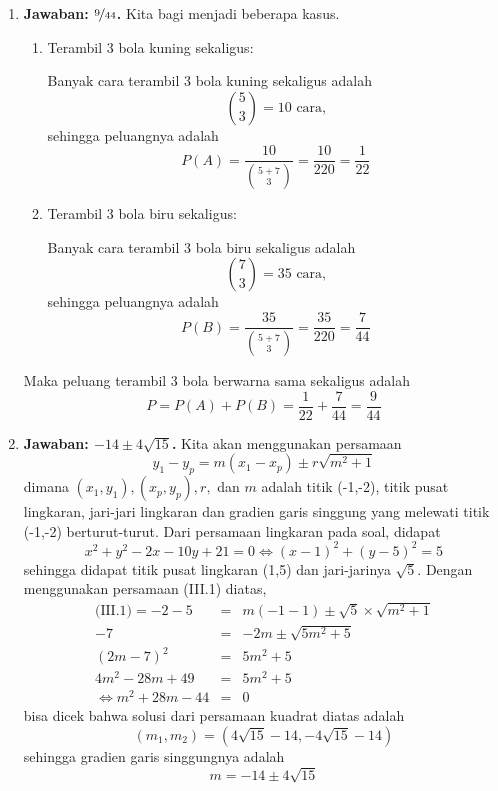 \begin{enumerate}
\item \textbf{Jawaban: $\nicefrac{9}{44}$.} Kita bagi menjadi beberapa kasus.
	\begin{enumerate}
	\item Terambil 3 bola kuning sekaligus:
		\par Banyak cara terambil 3 bola kuning sekaligus adalah $$\binom{5}{3} = 10\text{ cara,}$$sehingga peluangnya adalah $$P(A) = \frac{10}{\binom{5+7}{3}} = \frac{10}{220} = 		\frac{1}{22}$$
	\item Terambil 3 bola biru sekaligus:
		\par Banyak cara terambil 3 bola biru sekaligus adalah $$\binom{7}{3} = 35\text{ cara,}$$sehingga peluangnya adalah $$P(B) = \frac{35}{\binom{5+7}{3}} = \frac{35}{220} = 				\frac{7}{44}$$
	\end{enumerate}
Maka peluang terambil 3 bola berwarna sama sekaligus adalah $$P = P(A) + P(B) = \frac{1}{22} + \frac{7}{44} = \frac{9}{44}$$

\item \textbf{Jawaban: $-14\pm4\sqrt{15}$.} Kita akan menggunakan persamaan \setcounter{equation}{0}\begin{equation}y_1 - y_p = m(x_1-x_p) \pm r\sqrt{m^2+1}\end{equation}dimana $(x_1,y_1),(x_p,y_p), r,$ dan $m$ adalah titik (-1,-2), titik pusat lingkaran, jari-jari lingkaran dan gradien garis singgung yang melewati titik (-1,-2) berturut-turut. Dari persamaan lingkaran pada soal, didapat $$x^2+y^2 - 2x - 10y + 21 = 0\Leftrightarrow (x-1)^2 + (y-5)^2 = 5$$sehingga didapat titik pusat lingkaran (1,5) dan jari-jarinya $\sqrt{5}$. Dengan menggunakan persamaan (III.1) diatas,
	\begin{eqnarray*}
	\text{(III.1)} = -2 - 5 &=& m(-1 -1)\pm \sqrt{5}\times\sqrt{m^2+1}\\
			-7 &=& -2m \pm \sqrt{5m^2+5}\\
			(2m - 7)^2 &=& 5m^2+5\\
			4m^2-28m+49 &=& 5m^2+5\\
			\Leftrightarrow m^2+28m-44 &=& 0
	\end{eqnarray*}
bisa dicek bahwa solusi dari persamaan kuadrat diatas adalah $$(m_1, m_2) = (4\sqrt{15}-14, -4\sqrt{15}-14)$$sehingga gradien garis singgungnya adalah $$m = -14\pm4\sqrt{15}$$


\end{enumerate}
